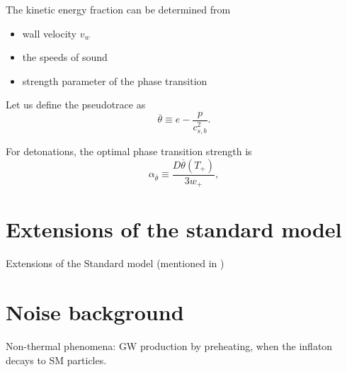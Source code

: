 The kinetic energy fraction can be determined from
\begin{itemize}
\item wall velocity $v_w$
\item the speeds of sound
\item strength parameter of the phase transition
\end{itemize}

Let us define the pseudotrace as
\cites[eq. 34]{giese_2020}[eq. 1]{giese_2021}
\begin{equation}
\overline{\theta} \equiv e - \frac{p}{c_{s,b}^2}.
\end{equation}

For detonations, the optimal phase transition strength is
\cites[eq. 34]{giese_2020}[eq. 1]{giese_2021}
\begin{equation}
\alpha_{\overline{\theta}} \equiv \frac{D \overline{\theta}(T_+)}{3w_+},
\end{equation}


\section{Extensions of the standard model}
Extensions of the Standard model \cite{caprini_detecting_2020}
(mentioned in \cite[p. 14]{lecture_notes})

\section{Noise background}
Non-thermal phenomena: GW production by preheating, when the inflaton decays to SM particles.
\cite{lecture_notes}
